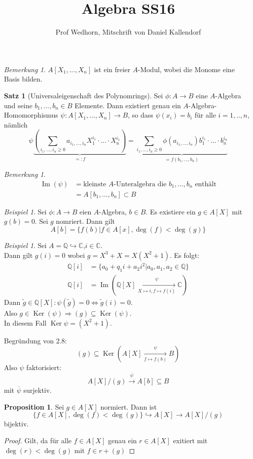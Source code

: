 \documentclass[10pt,a4paper]{article}
\author{Prof Wedhorn, Mitschrift von Daniel Kallendorf}
\title{Algebra SS16}
\newcommand{\Q}{\ensuremath{\mathbb{Q}}}
\newcommand{\C}{\ensuremath{\mathbb{C}}}
\newcommand{\ol}[1]{\overline{#1}}
\newcounter{thm}[section]
\theoremstyle{definition}
\newtheorem{satz}[thm]{Satz}
\newtheorem{prop}[thm]{Proposition}
\theoremstyle{plain}
\theoremstyle{remark}
\newtheorem{bem}[thm]{Bemerkung}
\newtheorem{exm}[thm]{Beispiel}
\begin{document}
	\maketitle
	\tableofcontents
	\setcounter{section}{2}
	\setcounter{thm}{7}
	\begin{bem}
		$A[X_1,...,X_n]$ ist ein freier $A$-Modul, wobei die Monome eine Basis bilden.
	\end{bem}
	\begin{satz}[Universaleigenschaft des Polynomrings]
		Sei $\phi:A\rightarrow B$ eine $A$-Algebra und seine $b_1,...,b_n\in B$ Elemente. Dann existiert genau ein $A$-Algebra-Homomorphismus $\psi:A[X_1,...,X_n]\rightarrow B$, so dass $\psi(x_i)=b_i$ für alle $i=1,..,n$, nämlich
		\[\psi\underbrace{\left(\sum_{i_1,...,i_n\ge 0}a_{i_1,...,i_n}X_1^{i_1}\cdot...\cdot X_n^{i_1}\right)}_{=:f}=\underbrace{\sum_{i_1,...,i_n\ge 0}\phi(a_{i_1,...,i_n})b_1^{i_1}\cdot...\cdot b_n^{i_n}}_{=f(b_1,...,b_n)}\]
	\end{satz}
	\begin{bem}
		\begin{align*}
		\operatorname{Im}(\psi)&=\text{kleinste $A$-Unteralgebra die $b_1,...,b_n$ enthält}\\
		&=A[b_1,...,b_n]\subset B
		\end{align*}
	\end{bem}
	\begin{exm}
		Sei $\phi:A\rightarrow B$ eien $A$-Algebra, $b\in B$. Es existiere ein $g\in A[X]$ mit $g(b)=0$. Sei $g$ nomriert. Dann gilt\\
		\[A[b]=\{f(b)|f\in A[x],\deg(f)<\deg (g)\}\]
	\end{exm}
	\begin{exm}
		Sei $A=\Q\hookrightarrow\C$,$i\in \C$. \\
		Dann gilt $g(i)=0$ wobei $g=X^3+X=X(X^2+1)$. Es folgt:
		\begin{align*}
		\Q[i]&=\{a_0+q_1i+a_2i^2|a_0,a_1,a_2\in\Q\}\\
		\Q[i]&=\operatorname{Im}(\Q[X]\xrightarrow[X\mapsto i, f\mapsto f(i)]{\psi}\C)
		\end{align*}
		Dann $\tilde{g}\in\Q[X]: \psi(\tilde{g})=0\Leftrightarrow \tilde{g}(i)=0$.\\
		Also $g\in\operatorname{Ker}(\psi)\Rightarrow (g)\subseteq\operatorname{Ker}(\psi)$.\\
	In diesem Fall $\operatorname{Ker}\psi=(X^2+1)$.\\
	\end{exm}
	Begründung von 2.8:
	\[(g)\subseteq\operatorname{Ker}\left(A[X]\xrightarrow[f\mapsto f(b)]{\psi}B\right)\]
	Also $\psi$ faktorisiert:
	\[A[X]/(g)\xrightarrow{\ol{\psi}}A[b]\subseteq B\]
	mit $\ol{\psi}$ surjektiv.
	\begin{prop}
		Sei $g\in A[X]$ normiert. Dann ist\[\{f\in A[X],\deg(f)<\deg(g)\}\hookrightarrow A[X]\rightarrow A[X]/(g)\]
		bijektiv.
	\end{prop}
	\begin{proof}
		Gilt, da für alle $f\in A[X]$ genau ein $r\in A[X]$ exitiert mit $\deg(r)<\deg(g)$ mit $f\in r+(g)$
	\end{proof}
\end{document}
